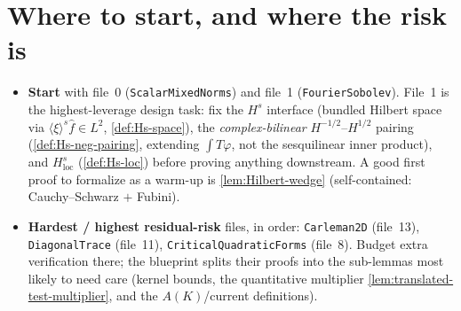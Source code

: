\documentclass[11pt,oneside]{book}
\theoremstyle{definition}
\theoremstyle{remark}
\newcommand{\1}{\mathbf 1}
\newcommand{\loc}{\mathrm{loc}}
\begin{document}
\section{Where to start, and where the risk is}
\begin{itemize}
\item \textbf{Start} with file~0 (\texttt{ScalarMixedNorms}) and file~1 (\texttt{FourierSobolev}). File~1 is the
      highest-leverage design task: fix the $H^{s}$ interface (bundled Hilbert space via
      $\langle\xi\rangle^s\widehat f\in L^2$, \cref{def:Hs-space}), the \emph{complex-bilinear}
      $H^{-1/2}$--$H^{1/2}$ pairing (\cref{def:Hs-neg-pairing}, extending $\int T\varphi$, not the sesquilinear
      inner product), and $H^s_\loc$ (\cref{def:Hs-loc}) before proving anything downstream. A good first proof
      to formalize as a warm-up is \cref{lem:Hilbert-wedge} (self-contained: Cauchy--Schwarz $+$ Fubini).
\item \textbf{Hardest / highest residual-risk} files, in order: \texttt{Carleman2D} (file~13), \texttt{DiagonalTrace}
      (file~11), \texttt{CriticalQuadraticForms} (file~8). Budget extra verification there; the blueprint splits
      their proofs into the sub-lemmas most likely to need care (kernel bounds, the quantitative multiplier
      \cref{lem:translated-test-multiplier}, and the $A(K)$/current definitions).
\end{itemize}

\backmatter
\end{document}
